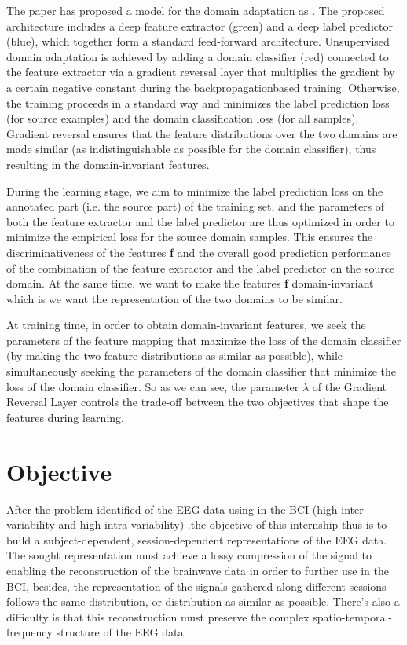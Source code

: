 The paper has proposed a model for the domain adaptation as . The proposed architecture includes a deep feature extractor (green) and a deep label predictor (blue), which together form a standard feed-forward architecture. Unsupervised domain adaptation is achieved by adding a domain classifier (red) connected to the feature extractor via a gradient reversal layer that multiplies the gradient by a certain negative constant during the backpropagationbased training. Otherwise, the training proceeds in a standard way and minimizes the label prediction loss (for source examples) and the domain classification loss (for all samples). Gradient reversal ensures that the feature distributions over the two domains are made similar (as indistinguishable as possible for the domain classifier), thus resulting in the domain-invariant features.

During the learning stage, we aim to minimize the label prediction loss on the annotated part (i.e. the source part) of the training set, and the parameters of both the feature extractor and the label predictor are thus optimized in order to minimize the empirical loss for the source domain samples. This ensures the discriminativeness of the features \textbf{f} and the overall good prediction performance of the combination of the feature extractor and the label predictor on the source domain. At the same time, we want to make the features \textbf{f} domain-invariant which is we want the representation of the two domains to be similar.

At training time, in order to obtain domain-invariant features, we seek the parameters of the feature mapping that maximize the loss of the domain classifier (by making the two feature distributions as similar as possible), while simultaneously seeking the parameters of the domain classifier that minimize the loss of the domain classifier. So as we can see, the parameter $\lambda$ of the Gradient Reversal Layer controls the trade-off between the two objectives that shape the features during learning.

\section{Objective}
After the problem identified of the EEG data using in the BCI (high inter-variability and high intra-variability) .the objective of this internship thus is to build a subject-dependent, session-dependent representations of the EEG data. The sought representation must achieve a lossy compression of the signal to enabling the reconstruction of the brainwave data in order to further use in the BCI, besides, the representation of the signals gathered along different sessions follows the same distribution, or distribution as similar as possible. There's also a difficulty is that this reconstruction must preserve the complex spatio-temporal-frequency structure of the EEG data.




